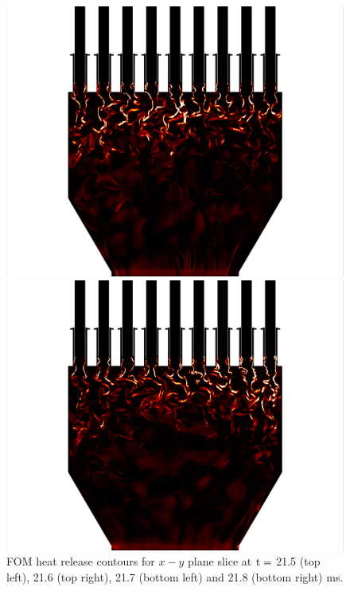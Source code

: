 \begin{figure}
	\begin{minipage}{0.49\linewidth}
		\includegraphics[width=0.99\linewidth,trim={0.5em 0em 6cm 0em},clip]{Chapters/HPROMResults/Images/nineElem/example_snaps/example_heat_z_217000.png}
	\end{minipage}
	\begin{minipage}{0.49\linewidth}
		\includegraphics[width=0.99\linewidth,trim={6cm 0em 0.5em 0em},clip]{Chapters/HPROMResults/Images/nineElem/example_snaps/example_heat_z_218000.png}
	\end{minipage}
	\caption{\label{fig:nineElemFOMHeat}FOM heat release contours for $x-y$ plane slice at $\text{t} = $ 21.5 (top left), 21.6 (top right), 21.7 (bottom left) and 21.8 (bottom right) ms.}
\end{figure}

